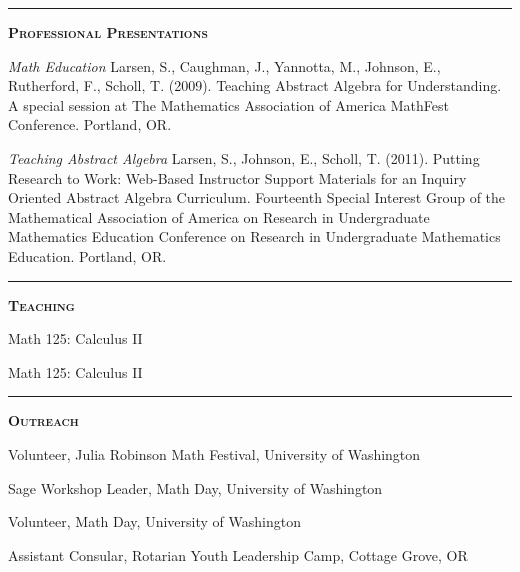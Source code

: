 \documentclass[12pt]{article}
\newcommand{\sectionheading}[1]
{
\bigskip %
\noindent
\hspace{-6.5mm}\textcolor{Gray}{\rule[.75mm]{21.5mm}{1mm}} %
\hspace{.2mm}	%
{\large{\textbf{\textsc{#1}}}} %
}
\newenvironment{date_section}
	{
	\vspace{-1ex}
	\leftmargini = 15ex
		\begin{itemize}[
			labelsep = *,
			labelwidth = 9ex,
			labelindent = 0ex,
			itemindent = !,
			font=\normalfont,
			align=parleft
		]{}
		\itemsep=-1.5mm
	}
	{\end{itemize}\vspace{-2ex}}
\newcommand{\yearmo}[2]{
	\item[
		{\makebox[1ex][r]{#1}}
		\hspace{1ex}
		{\makebox[1ex][l]{#2} }
		] }
\begin{document}
	\sectionheading{Professional Presentations}%

		\begin{date_section}


			\yearmo{2009}{} %
			\emph{Math Education}
				Larsen, S., Caughman, J., Yannotta, M.,
				Johnson, E., Rutherford, F., Scholl, T.
				(2009). Teaching Abstract Algebra for
				Understanding. A special session at The
				Mathematics Association of America MathFest
				Conference. Portland, OR.

			\yearmo{2011}{} %
			\emph{Teaching Abstract Algebra}
				Larsen, S., Johnson, E., Scholl, T. (2011).
				Putting Research to Work: Web-Based Instructor
				Support Materials for an Inquiry Oriented
				Abstract Algebra Curriculum. Fourteenth Special
				Interest Group of the Mathematical Association
				of America on Research in Undergraduate
				Mathematics Education Conference on Research
				in Undergraduate Mathematics Education.
				Portland, OR.

		\end{date_section}

	\sectionheading{Teaching}%

		\begin{date_section}

			\yearmo{2014}{}%
				Math 125: Calculus II
				
			\yearmo{2015}{}%
				Math 125: Calculus II

		\end{date_section}

	\sectionheading{Outreach}%

			\begin{date_section}

				\yearmo{2015}{}
					Volunteer,
					Julia Robinson Math Festival,
					University of Washington

				\yearmo{2015}{}
					Sage Workshop Leader,
					Math Day,
					University of Washington

				\yearmo{2014}{}
					Volunteer,
					Math Day,
					University of Washington

				\yearmo{2010}{}
					Assistant Consular,
					Rotarian Youth Leadership Camp,
					Cottage Grove, OR

			\end{date_section}


\end{document}
